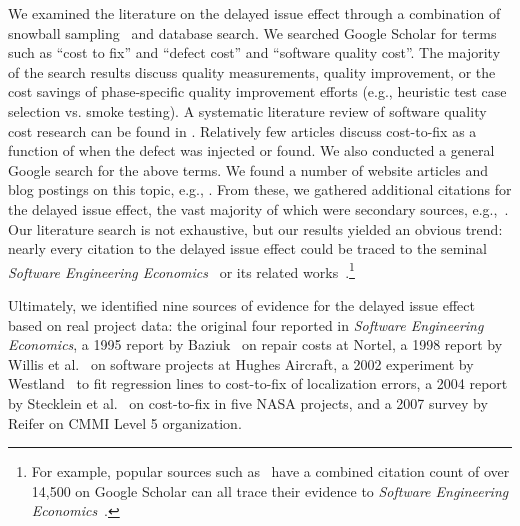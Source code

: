 \documentclass[smallcondensed]{svjour3}
\begin{document}
We examined the literature on the delayed issue effect through a combination of snowball sampling~\cite{wohlin2014guidelines} and database search. We searched Google Scholar for terms such as ``cost to fix'' and ``defect cost'' and ``software quality cost''. The majority of the search results discuss quality measurements, quality improvement, or the cost savings of phase-specific quality improvement efforts (e.g., heuristic test case selection vs. smoke testing). A systematic literature review of software quality cost research can be found in \cite{karg2011systematic}. Relatively few articles discuss cost-to-fix as a function of when the defect was injected or found. We also conducted a general Google search for the above terms. We found a number of website articles and blog postings on this topic, e.g., \cite{IfSQ2013,Soni2016,Parker2013,Gordon2016}. From these, we gathered additional citations for the delayed issue effect, the vast majority of which were secondary sources, e.g.,~\cite{Leffingwell96,mead2004software,mcconnell1996software,mcconnell01,Tassey2002,boehm2012}. Our literature search is not exhaustive, but our results yielded an obvious trend: nearly every citation to the delayed issue effect could be traced to the seminal \textit{Software Engineering Economics}~\cite{Boehm81} or its related works~\cite{boehm88,boehm01}.\footnote{For example, popular sources such as~\cite{pressman2005software, boehm01,glass02,endres03} have a combined citation count of over 14,500 on Google Scholar can all trace their evidence to \textit{Software Engineering Economics}~\cite{Boehm81}.}


Ultimately, we identified nine sources of evidence for the delayed issue effect based on real project data: the original four \cite{Fagan76,Boehm76,Daly77,Stephenson76} reported in \textit{Software Engineering Economics}\cite{Boehm81}, a 1995 report by Baziuk~\cite{baziuk1995bnr} on repair costs at Nortel, a 1998 report by Willis et al.~\cite{willis1998hughes} on software projects at Hughes Aircraft, a 2002 experiment by Westland~\cite{westland2002cost} to fit regression lines to cost-to-fix of localization errors, a 2004 report by Stecklein et al.~\cite{steck04} on cost-to-fix in five NASA projects, and a 2007 survey by Reifer on CMMI Level 5 organization\cite{reifer2007profiles}.
\end{document}
